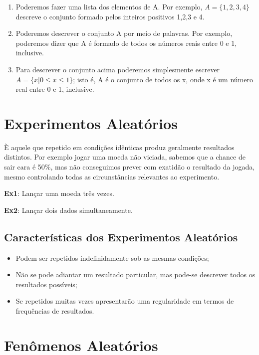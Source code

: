 \begin{enumerate}
    \item Poderemos fazer uma lista dos elementos de A. Por
    exemplo, $A = \{ 1,2,3,4 \}$ descreve o conjunto formado pelos
    inteiros positivos 1,2,3 e 4.
    \item Poderemos descrever o conjunto A por meio de palavras.
    Por exemplo, poderemos dizer que A é formado de todos os
    números reais entre 0 e 1, inclusive.
    \item Para descrever o conjunto acima poderemos simplesmente
    escrever $A = \{ x|0\leq x \leq 1 \}$; isto é, A é o conjunto
    de todos os x, onde x é um número real entre 0 e 1, inclusive.
\end{enumerate}


\section{Experimentos Aleatórios}

È aquele que repetido em condições idênticas produz geralmente
resultados distintos. Por exemplo jogar uma moeda não viciada,
sabemos que a chance de sair cara é 50\%, mas não conseguimos
prever com exatidão o resultado da jogada, mesmo controlando todas
as circunstâncias relevantes ao experimento.\vskip0.3cm


\textbf{Ex1}: Lançar uma moeda três vezes. \vskip0.3cm

\textbf{Ex2}: Lançar dois dados simultaneamente. \vskip0.3cm

\subsection{Características dos Experimentos Aleatórios}


\begin{itemize}
    \item Podem ser repetidos indefinidamente sob as mesmas
   condições;
   \item Não se pode adiantar um resultado particular, mas
    pode-se descrever todos os resultados possíveis;
    \item Se repetidos muitas vezes apresentarão uma regularidade
    em termos de frequências de resultados.
\end{itemize}


\section{Fenômenos Aleatórios}

